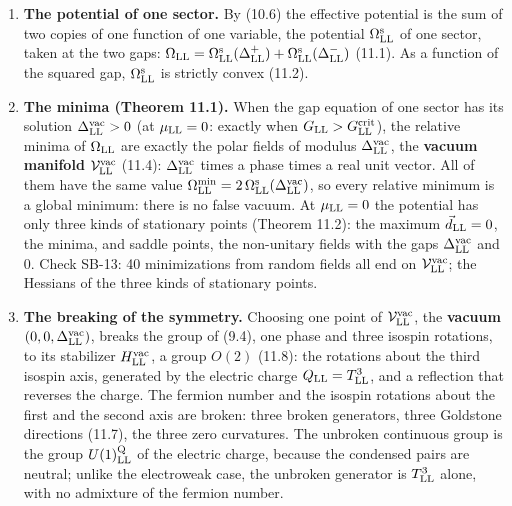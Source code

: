 \documentclass[
  10pt,
]{article}
\providecommand{\tightlist}{%
  \setlength{\itemsep}{0pt}\setlength{\parskip}{0pt}}
\begin{document}
\begin{enumerate}
\def\labelenumi{\arabic{enumi}.}
\tightlist
\item
  \textbf{The potential of one sector.} By (10.6) the effective
  potential is the sum of two copies of one function of one variable,
  the potential \(\Omega^{\rm s}_{\rm LL}\) of one sector, taken at the
  two gaps:
  \(\Omega_{\rm LL}=\Omega^{\rm s}_{\rm LL}(\Delta^+_{\rm LL})+\Omega^{\rm s}_{\rm LL}(\Delta^-_{\rm LL})\)
  (11.1). As a function of the squared gap, \(\Omega^{\rm s}_{\rm LL}\)
  is strictly convex (11.2).
\item
  \textbf{The minima (Theorem 11.1).} When the gap equation of one
  sector has its solution \(\Delta^{\rm vac}_{\rm LL}>0\) (at
  \(\mu_{\rm LL}=0\): exactly when
  \(G_{\rm LL}>G^{\rm crit}_{\rm LL}\)), the relative minima of
  \(\Omega_{\rm LL}\) are exactly the polar fields of modulus
  \(\Delta^{\rm vac}_{\rm LL}\), the \textbf{vacuum manifold}
  \(\mathcal V^{\rm vac}_{\rm LL}\) (11.4):
  \(\Delta^{\rm vac}_{\rm LL}\) times a phase times a real unit vector.
  All of them have the same value
  \(\Omega^{\rm min}_{\rm LL}=2\,\Omega^{\rm s}_{\rm LL}(\Delta^{\rm vac}_{\rm LL})\),
  so every relative minimum is a global minimum: there is no false
  vacuum. At \(\mu_{\rm LL}=0\) the potential has only three kinds of
  stationary points (Theorem 11.2): the maximum \(\vec d_{\rm LL}=0\),
  the minima, and saddle points, the non-unitary fields with the gaps
  \(\Delta^{\rm vac}_{\rm LL}\) and 0. Check SB-13: 40 minimizations
  from random fields all end on \(\mathcal V^{\rm vac}_{\rm LL}\); the
  Hessians of the three kinds of stationary points.
\item
  \textbf{The breaking of the symmetry.} Choosing one point of
  \(\mathcal V^{\rm vac}_{\rm LL}\), the \textbf{vacuum}
  \((0,0,\Delta^{\rm vac}_{\rm LL})\), breaks the group of (9.4), one
  phase and three isospin rotations, to its stabilizer
  \(H^{\rm vac}_{\rm LL}\), a group \(O(2)\) (11.8): the rotations about
  the third isospin axis, generated by the electric charge
  \(Q_{\rm LL}=T^3_{\rm LL}\), and a reflection that reverses the
  charge. The fermion number and the isospin rotations about the first
  and the second axis are broken: three broken generators, three
  Goldstone directions (11.7), the three zero curvatures. The unbroken
  continuous group is the group \(U(1)^{\rm Q}_{\rm LL}\) of the
  electric charge, because the condensed pairs are neutral; unlike the
  electroweak case, the unbroken generator is \(T^3_{\rm LL}\) alone,
  with no admixture of the fermion number.

\end{enumerate}
\end{document}
